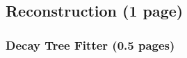 
\subsection{Reconstruction (1 page)}
\label{sec:detector:software:reconstruction}

\subsubsection{Decay Tree Fitter (0.5 pages)}
\label{sec:dataanalysis:dtf}